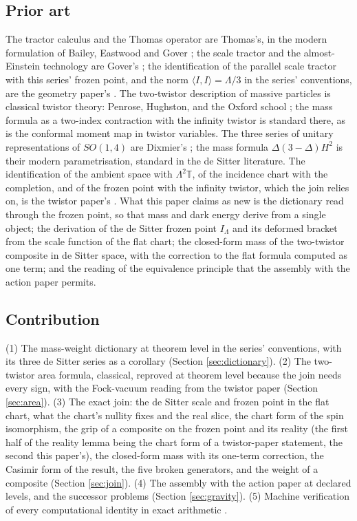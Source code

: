 \documentclass[11pt]{article}
\theoremstyle{definition}
\newcommand{\T}{\mathbb{T}}
\newcommand{\ip}[2]{\langle #1, #2\rangle}
\begin{document}
\subsection*{Prior art}

The tractor calculus and the Thomas operator are Thomas's, in the modern formulation of Bailey, Eastwood and Gover \cite{BEG1994}; the scale tractor and the almost-Einstein technology are Gover's \cite{Gover2010}; the identification of the parallel scale tractor with this series' frozen point, and the norm $\ip{I}{I} = \Lambda/3$ in the series' conventions, are the geometry paper's \cite{ButlerT6}. The two-twistor description of massive particles is classical twistor theory: Penrose, Hughston, and the Oxford school \cite{PenroseRindler1986, Hughston1979}; the mass formula as a two-index contraction with the infinity twistor is standard there, as is the conformal moment map in twistor variables. The three series of unitary representations of $SO(1,4)$ are Dixmier's \cite{Dixmier1961}; the mass formula $\Delta(3-\Delta)H^{2}$ is their modern parametrisation, standard in the de Sitter literature. The identification of the ambient space with $\Lambda^{2}\T$, of the incidence chart with the completion, and of the frozen point with the infinity twistor, which the join relies on, is the twistor paper's \cite{ButlerT9}. What this paper claims as new is the dictionary read through the frozen point, so that mass and dark energy derive from a single object; the derivation of the de Sitter frozen point $I_{\Lambda}$ and its deformed bracket from the scale function of the flat chart; the closed-form mass of the two-twistor composite in de Sitter space, with the correction to the flat formula computed as one term; and the reading of the equivalence principle that the assembly with the action paper permits.

\subsection*{Contribution}

(1) The mass-weight dictionary at theorem level in the series' conventions, with its three de Sitter series as a corollary (Section \ref{sec:dictionary}). (2) The two-twistor area formula, classical, reproved at theorem level because the join needs every sign, with the Fock-vacuum reading from the twistor paper (Section \ref{sec:area}). (3) The exact join: the de Sitter scale and frozen point in the flat chart, what the chart's nullity fixes and the real slice, the chart form of the spin isomorphism, the grip of a composite on the frozen point and its reality (the first half of the reality lemma being the chart form of a twistor-paper statement, the second this paper's), the closed-form mass with its one-term correction, the Casimir form of the result, the five broken generators, and the weight of a composite (Section \ref{sec:join}). (4) The assembly with the action paper at declared levels, and the successor problems (Section \ref{sec:gravity}). (5) Machine verification of every computational identity in exact arithmetic \cite{ButlerVerifyT11}.
\end{document}
